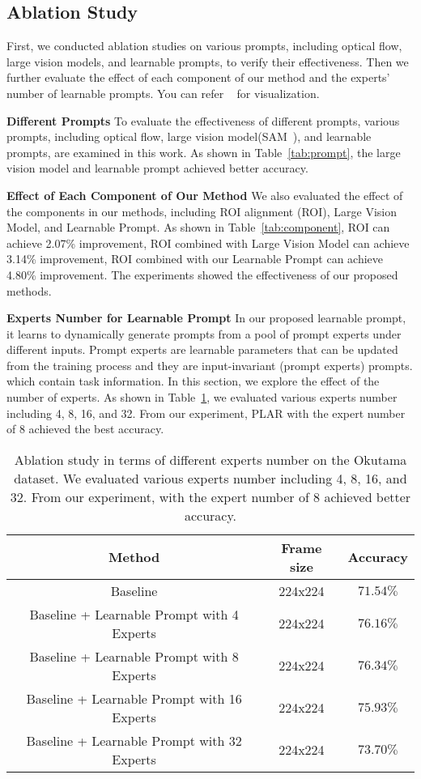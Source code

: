 \documentclass[letterpaper, 10 pt, conference]{ieeeconf}
\begin{document}
\subsection{Ablation Study}
First, we conducted ablation studies on various prompts, including optical flow, large vision models, and learnable prompts, to verify their effectiveness. Then we further evaluate the effect of each component of our method and the experts' number of learnable prompts. You can refer ~\cite{wang2023prompt} for visualization.



\textbf{Different Prompts}
To evaluate the effectiveness of different prompts, various prompts, including optical flow, large vision model(SAM~\cite{kirillov2023segment}), and learnable prompts, are examined in this work. As shown in Table~\ref{tab:prompt}, the large vision model and learnable prompt achieved better accuracy.

\textbf{Effect of Each Component of Our Method}
We also evaluated the effect of the components in our methods, including ROI alignment (ROI), Large Vision Model, and Learnable Prompt. As shown in Table~\ref{tab:component}, ROI can achieve 2.07\% improvement, ROI combined with Large Vision Model can achieve 3.14\% improvement, ROI combined with our Learnable Prompt can achieve 4.80\% improvement. The experiments showed the effectiveness of our proposed methods.


\textbf{Experts Number for Learnable Prompt}
In our proposed learnable prompt, it learns to dynamically generate prompts from a pool of prompt experts under different inputs. Prompt experts are learnable parameters that can be updated from the training process and they are input-invariant (prompt experts) prompts. which contain task information. In this section, we explore the effect of the number of experts. As shown in Table~\ref{tab:expert_num}, we evaluated various experts number including 4, 8, 16, and 32. From our experiment, PLAR with the expert number of 8 achieved the best accuracy.
\begin{table}[h]
\centering
\begin{tabular}{c c c }
\toprule
Method & Frame size  & Accuracy    \\
\midrule
Baseline & 224x224 & $71.54\%$  \\
Baseline + Learnable Prompt with 4 Experts  & 224x224 & $76.16\%$  \\
Baseline + Learnable Prompt with 8 Experts & 224x224 & $76.34\%$  \\
Baseline + Learnable Prompt with 16 Experts & 224x224 & $75.93\%$  \\
Baseline + Learnable Prompt with 32 Experts & 224x224 & $73.70\%$  \\
\bottomrule
\end{tabular}
\caption{Ablation study in terms of different experts number on the Okutama dataset. We evaluated various experts number including 4, 8, 16, and 32. From our experiment, with the expert number of 8 achieved better accuracy.}
\label{tab:expert_num}
\vspace{-4mm}
\end{table} 
\end{document}
